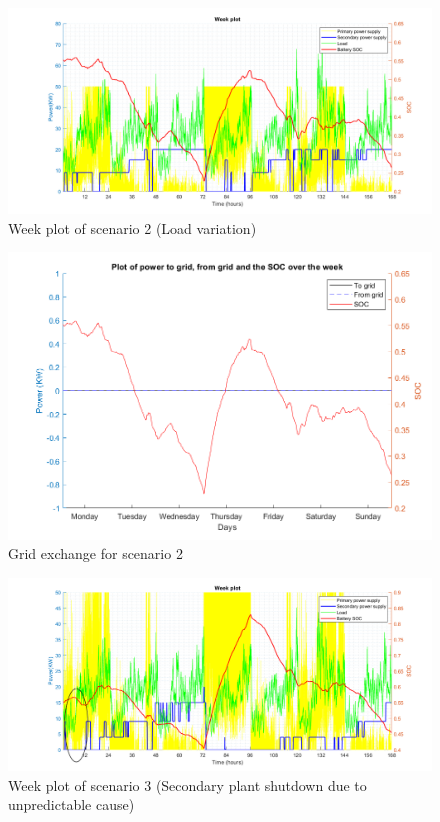 \begin{figure}[H]
    \centering
    \includegraphics[width=1 \linewidth]{Final_report/Images/Week_plot_s2.png}
    \caption{Week plot of scenario 2 (Load variation)}
    \label{fig:week_plot_s2}
\end{figure}

\begin{figure}[H]
    \centering
    \includegraphics[width=0.7 \linewidth]{Final_report/Images/to_from_SOC_s2.png}
    \caption{Grid exchange for scenario 2}
    \label{fig:grid_s2}
\end{figure}

\begin{figure}[H]
    \centering
    \includegraphics[width=1 \linewidth]{Final_report/Images/Week_plot_s3.png}
    \caption{Week plot of scenario 3 (Secondary plant shutdown due to unpredictable cause)}
    \label{fig:week_plot_s3}
\end{figure}

